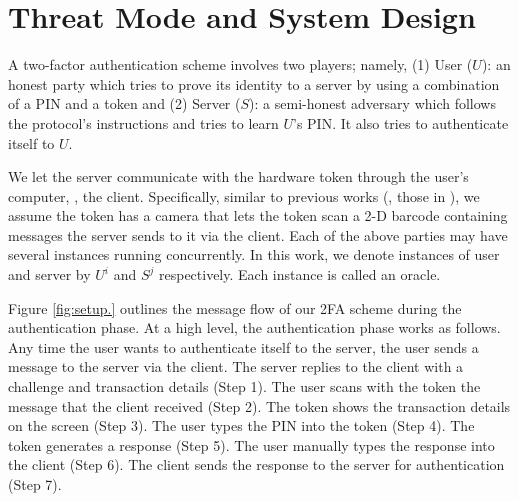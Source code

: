 


\section{Threat Mode and System Design}\label{sec::model}

A two-factor authentication scheme involves two players; namely, (1) {User ($U$)}: an honest party which tries to prove its identity to a server by using a combination of a PIN and a token and (2) {Server ($S$)}:  a semi-honest adversary which follows the protocol's instructions and tries to learn $U$'s PIN. It also tries to authenticate itself to $U$.  


We let the server communicate with the hardware token through the user's computer, \ie, the client. Specifically, similar to previous works (\eg, those in \cite{JareckiJKSS21,Digipass-website,Gemalto}), we assume the token has a camera that lets the token scan a 2-D barcode containing messages the server sends to it via the client. Each of the above parties may have several instances running concurrently. In this work, we denote instances of user and server by  $U^{i}$ and  $S^{j}$ respectively. Each instance is called an oracle.  

Figure \ref{fig:setup.} outlines the message flow of our 2FA scheme during the authentication phase.  At a high level, the authentication phase works as follows. Any time the user wants to authenticate itself to the server, the user sends a message to the server via the client.  The server replies to the client with a challenge and transaction details (Step 1). The user scans with the token the message that the client received  (Step 2). The token shows the transaction details on the screen (Step 3). The user types the PIN into the token (Step 4). The token generates a response (Step 5). The user manually types the response into the client (Step 6).  The client sends the response to the server for authentication (Step 7). 




